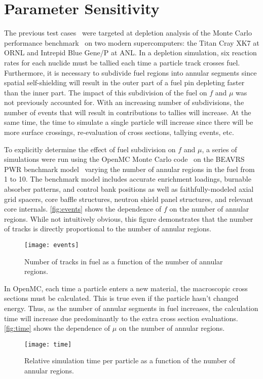 \documentclass{snamc2013}
\begin{document}
\section{Parameter Sensitivity}

The previous test cases~\cite{jcp-romano-2013} were targeted at depletion
analysis of the Monte Carlo performance benchmark~\cite{mc-hoogenboom-2011} on
two modern supercomputers: the Titan Cray XK7 at ORNL and Intrepid Blue Gene/P
at ANL. In a depletion simulation, six reaction rates for each nuclide must be
tallied each time a particle track crosses fuel. Furthermore, it is necessary to
subdivide fuel regions into annular segments since spatial self-shielding will
result in the outer part of a fuel pin depleting faster than the inner part. The
impact of this subdivision of the fuel on $f$ and $\mu$ was not previously
accounted for. With an increasing number of subdivisions, the number of events
that will result in contributions to tallies will increase. At the same time,
the time to simulate a single particle will increase since there will be more
surface crossings, re-evaluation of cross sections, tallying events, etc.

To explicitly determine the effect of fuel subdivision on $f$ and $\mu$, a
series of simulations were run using the OpenMC Monte Carlo
code~\cite{ane-romano-2013} on the BEAVRS PWR benchmark
model~\cite{mc-horelik-2013} varying the number of annular regions in the fuel
from 1 to 10. The benchmark model includes accurate enrichment loadings,
burnable absorber patterns, and control bank positions as well as
faithfully-modeled axial grid spacers, core baffle structures, neutron shield
panel structures, and relevant core internals. \autoref{fig:events} shows the
dependence of $f$ on the number of annular regions. While not intuitively
obvious, this figure demonstrates that the number of tracks is directly
proportional to the number of annular regions.
\begin{figure}[htb]
  \centering
  \texttt{[image: events]}
  \caption{Number of tracks in fuel as a function of the number of annular
    regions.}
  \label{fig:events}
\end{figure}

In OpenMC, each time a particle enters a new material, the macroscopic cross
sections must be calculated. This is true even if the particle hasn't changed
energy. Thus, as the number of annular segments in fuel increases, the
calculation time will increase due predominantly to the extra cross section
evaluations. \autoref{fig:time} shows the dependence of $\mu$ on the number of
annular regions.
\begin{figure}[b]
  \centering
  \texttt{[image: time]}
  \caption{Relative simulation time per particle as a function of the number of
    annular regions.}
  \label{fig:time}
\end{figure}
\end{document}
